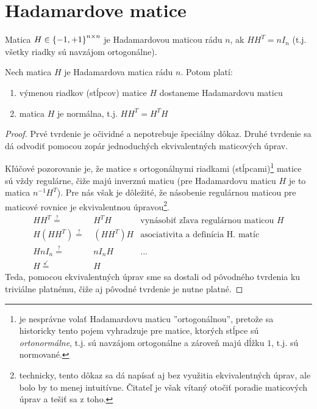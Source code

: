 \section{Hadamardove matice}

\begin{definition}
Matica $H \in \left\{-1, +1\right\}^{n \times n}$ je Hadamardovou maticou rádu $n$, ak $HH^T = nI_n$ (t.j. všetky riadky sú navzájom ortogonálne).
\end{definition}

\begin{theorem}
Nech matica $H$ je Hadamardova matica rádu $n$. Potom platí:
\begin{enumerate}
    \item výmenou riadkov (stĺpcov) matice $H$ dostaneme Hadamardovu maticu
    \item matica $H$ je normálna, t.j. $HH^T = H^T H$
\end{enumerate}
\end{theorem}

\begin{toreview}
\begin{proof}
Prvé tvrdenie je očividné a nepotrebuje špeciálny dôkaz.
Druhé tvrdenie sa dá odvodiť pomocou zopár jednoduchých ekvivalentných maticových úprav.

Kľúčové pozorovanie je, že matice s ortogonálnymi riadkami (stĺpcami)\footnote{je nesprávne volať Hadamardovu maticu ''ortogonálnou'', pretože sa historicky tento pojem vyhradzuje pre matice, ktorých stĺpce sú \emph{ortonormálne}, t.j. sú navzájom ortogonálne a zároveň majú dĺžku $1$, t.j. sú normované.} matice sú vždy regulárne, čiže majú inverznú maticu (pre Hadamardovu maticu $H$ je to matica $n^{-1} H^T$).
Pre nás však je dôležité, že násobenie regulárnou maticou pre maticové rovnice je ekvivalentnou úpravou\footnote{technicky, tento dôkaz sa dá napísať aj bez využitia ekvivalentných úprav, ale bolo by to menej intuitívne. Čitateľ je však vítaný otočiť poradie maticových úprav a tešiť sa z toho.}.
\begin{align*}
    HH^T \overset{?}{=}&~ H^TH&\text{vynásobiť zľava regulárnou maticou $H$}\\
    H(HH^T) \overset{?}{=}&~ (HH^T)H&\text{asociativita a definícia H. matíc}\\
    HnI_n \overset{?}{=}&~ nI_nH&\text{...}\\
    H \overset{\checkmark}{=}&~ H&\text{}
\end{align*}
Teda, pomocou ekvivalentných úprav sme sa dostali od pôvodného tvrdenia ku triviálne platnému, čiže aj pôvodné tvrdenie je nutne platné.
\end{proof}
\end{toreview}

